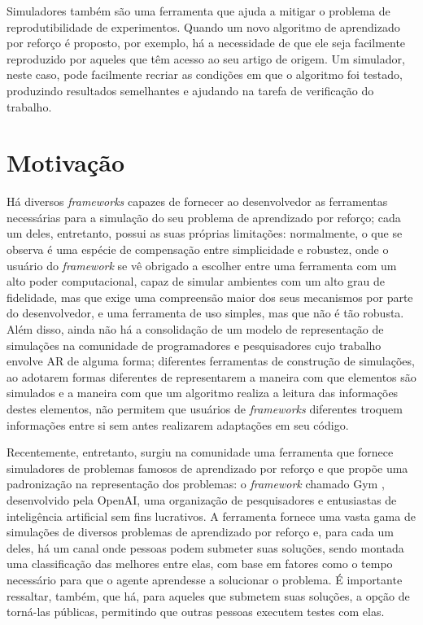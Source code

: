 \documentclass[cic,tc]{iiufrgs}
\begin{document}
Simuladores também são uma ferramenta que ajuda a mitigar o problema de
reprodutibilidade de experimentos. Quando um novo algoritmo de aprendizado
por reforço é proposto, por exemplo, há a necessidade de que ele seja facilmente
reproduzido por aqueles que têm acesso ao seu artigo de origem. Um simulador,
neste caso, pode facilmente recriar as condições em que o algoritmo foi testado,
produzindo resultados semelhantes e ajudando na tarefa de verificação do
trabalho.


\section{Motivação}
Há diversos \textit{frameworks} capazes de fornecer ao desenvolvedor as
ferramentas necessárias para a simulação do seu problema de aprendizado por
reforço; cada um deles, entretanto, possui as suas próprias limitações: normalmente, o
que se observa é uma espécie de compensação entre simplicidade e robustez, onde
o usuário do \textit{framework} se vê obrigado a escolher entre uma ferramenta
com um alto poder computacional, capaz de simular ambientes com um alto grau de
fidelidade, mas que exige uma compreensão maior dos seus mecanismos por parte do
desenvolvedor, e uma ferramenta de uso simples, mas que não é tão robusta. Além
disso, ainda não há a consolidação de um modelo de representação de simulações
na comunidade de programadores e pesquisadores cujo trabalho envolve AR de
alguma forma; diferentes ferramentas de construção de simulações, ao adotarem
formas diferentes de representarem a maneira com que elementos são simulados e a
maneira com que um algoritmo realiza a leitura das informações destes elementos,
não permitem que usuários de \textit{frameworks} diferentes troquem informações
entre si sem antes realizarem adaptações em seu código.


Recentemente, entretanto, surgiu na comunidade uma ferramenta que fornece
simuladores de problemas famosos de aprendizado por reforço e que propõe uma
padronização na representação dos problemas: o \textit{framework} chamado Gym \cite{Gym},
desenvolvido pela OpenAI, uma organização de pesquisadores e entusiastas
de inteligência artificial sem fins lucrativos. A ferramenta fornece uma vasta
gama de simulações de diversos problemas de aprendizado por reforço e, para
cada um deles, há um canal onde pessoas podem submeter suas soluções, sendo
montada uma classificação das melhores entre elas, com base em fatores como
o tempo necessário para que o agente aprendesse a solucionar o problema. É
importante ressaltar, também, que há, para aqueles que submetem suas soluções,
a opção de torná-las públicas, permitindo que outras pessoas executem testes
com elas.
\end{document}
